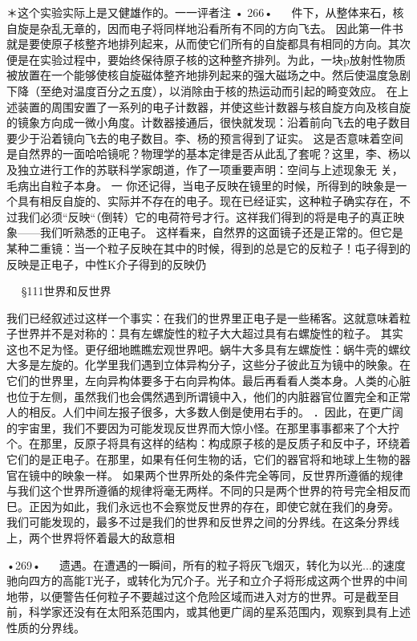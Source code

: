＊这个实验实际上是又健雄作的。一一评者注
•	266•
  
件下，从整体来石，核自旋是杂乱无章的，因而电子将同样地沿看所有不同的方向飞去。
因此第一件书就是要使原子核整齐地排列起来，从而使它们所有的自旋都具有相同的方向。其次便是在实验过程中，要始终保待原子核的这种整齐排列。为此，一块p放射性物质被放置在一个能够使核自旋磁体整齐地排列起来的强大磁场之中。然后使温度急剧下降（至绝对温度百分之五度），以消除由于核的热运动而引起的畸变效应。
在上述装置的周围安置了一系列的电子计数器，并使这些计数器与核自旋方向及核自旋的镜象方向成一微小角度。计数器接通后，很快就发现：沿着前向飞去的电子数目要少于沿着镜向飞去的电子数目。李、杨的预言得到了证实。
这是否意味着空间是自然界的一面哈哈镜呢？物理学的基本定律是否从此乱了套呢？这里，李、杨以及独立进行工作的苏联科学家朗道，作了一项重要声明：空间与上述现象无
	关，毛病出自粒子本身。	一
你还记得，当电子反映在镜里的时候，所得到的映象是一个具有相反自旋的、实际并不存在的电子。现在已经证实，这种粒子确实存在，不过我们必须“反映“（倒转）它的电荷符号才行。这祥我们得到的将是电子的真正映象——我们听熟悉的正电子。
这样看来，自然界的这面镜子还是正常的。但它是某种二重镜：当一个粒子反映在其中的时候，得到的总是它的反粒子！屯子得到的反映是正电子，中性K介子得到的反映仍

  
§111世界和反世界

我们已经叙述过这样一个事实：在我们的世界里正电子是一些稀客。这就意味着粒子世界并不是对称的：具有左螺旋性的粒子大大超过具有右螺旋性的粒子。
其实这也不足为怪。更仔细地瞧瞧宏观世界吧。蜗牛大多具有左螺旋性：蜗牛壳的螺纹大多是左旋的。化学里我们遇到立体异构分子，这些分子彼此互为镜中的映象。在它们的世界里，左向异构体要多于右向异构体。最后再看看人类本身。人类的心脏也位于左侧，虽然我们也会偶然遇到所谓镜中入，他们的内脏器官位置完全和正常人的相反。人们中间左报子很多，大多数人倒是使用右手的。
．因此，在更广阔的宇宙里，我们不要因为可能发现反世界而大惊小怪。在那里事事都来了个大拧个。在那里，反原子将具有这样的结构：构成原子核的是反质子和反中子，环绕着它们的是正电子。在那里，如果有任何生物的话，它们的器官将和地球上生物的器官在镜中的映象一样。
如果两个世界所处的条件完全等同，反世界所遵循的规律与我们这个世界所遵循的规律将毫无两样。不同的只是两个世界的符号完全相反而巳。正因为如此，我们永远也不会察觉反世界的存在，即使它就在我们的身旁。
我们可能发现的，最多不过是我们的世界和反世界之间的分界线。在这条分界线上，两个世界将怀着最大的敌意相

•269•
  
遗遇。在遭遇的一瞬间，所有的粒子将灰飞烟灭，转化为以光...的速度驰向四方的高能T光子，或转化为冗介子。光子和立介子将形成这两个世界的中间地带，以便警告任何粒子不要越过这个危险区域而进入对方的世界。可是截至目前，科学家还没有在太阳系范围内，或其他更广阔的星系范围内，观察到具有上述性质的分界线。

